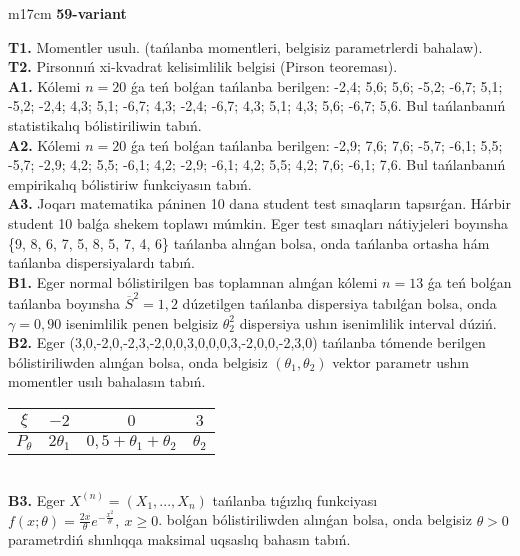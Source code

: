 \documentclass{article}
\begin{document}
\vspace{1cm}


\begin{tabular}{m{17cm}}
\textbf{59-variant}
\newline

\textbf{T1.} 
Momentler usulı. (tańlanba momentleri, belgisiz parametrlerdi bahalaw).
 \\
\textbf{T2.} 
Pirsonnıń xi-kvadrat kelisimlilik belgisi (Pirson teoreması).
 \\
\textbf{A1.} 
Kólemi \(n = 20\) ǵa teń bolǵan tańlanba berilgen: -2,4; 5,6; 5,6; -5,2; -6,7; 5,1; -5,2; -2,4; 4,3; 5,1; -6,7; 4,3; -2,4; -6,7; 4,3; 5,1; 4,3; 5,6; -6,7; 5,6. Bul tańlanbanıń statistikalıq bólistiriliwin tabıń.
 \\
\textbf{A2.} 
Kólemi \(n = 20\) ǵa teń bolǵan tańlanba berilgen: -2,9; 7,6; 7,6; -5,7; -6,1; 5,5; -5,7; -2,9; 4,2; 5,5; -6,1; 4,2; -2,9; -6,1; 4,2; 5,5; 4,2; 7,6; -6,1; 7,6. Bul tańlanbanıń empirikalıq bólistiriw funkciyasın tabıń.
 \\
\textbf{A3.} 
Joqarı matematika páninen 10 dana student test sınaqların tapsırǵan. Hárbir student 10 balǵa shekem toplawı múmkin. Eger test sınaqları nátiyjeleri boyınsha \{9, 8, 6, 7, 5, 8, 5, 7, 4, 6\} tańlanba alınǵan bolsa, onda tańlanba ortasha hám tańlanba dispersiyalardı tabıń.
 \\
\textbf{B1.} 
Eger normal bólistirilgen bas toplamnan alınǵan kólemi \(n = 13\) ǵa teń bolǵan tańlanba boyınsha \({\overline{S}}^{2} = 1,2\) dúzetilgen tańlanba dispersiya tabılǵan bolsa, onda \(\gamma = 0,90\) isenimlilik penen belgisiz \(\theta_{2}^{2}\) dispersiya ushın isenimlilik interval dúziń.
 \\
\textbf{B2.} 
Eger (3,0,-2,0,-2,3,-2,0,0,3,0,0,0,3,-2,0,0,-2,3,0) tańlanba tómende berilgen bólistiriliwden alınǵan bolsa, onda belgisiz \(\left( \theta_{1},\theta_{2} \right)\) vektor parametr ushın momentler usılı bahalasın tabıń.
\begin{tabular}{|c|c|c|c|}
  \hline
$\xi$ &
$- 2$ &
$0$ &
$3$\\
\hline
\(P_{\theta}\) & \({2\theta}_{1}\) & \(0,5 + \theta_{1} + \theta_{2}\) & \(\theta_{2}\) \\
\hline
\end{tabular}
 \\
\textbf{B3.} 
Eger \(X^{(n)} = \left( X_{1},...,X_{n} \right)\) tańlanba tıǵızlıq funkciyası \(f(x;\theta) = \frac{2x}{\theta}e^{- \frac{x^{2}}{\theta}},\ x \geq 0\). bolǵan bólistiriliwden alınǵan bolsa, onda belgisiz \(\theta > 0\) parametrdiń shınlıqqa maksimal uqsaslıq bahasın tabıń.

\end{tabular}
\end{document}

